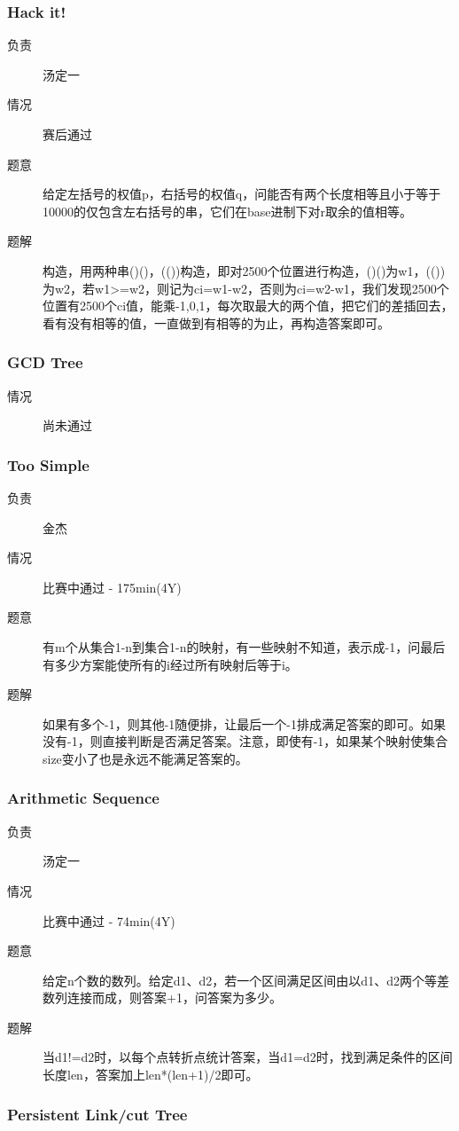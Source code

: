 \documentclass[a4paper, 11pt, nofonts, nocap, fancyhdr]{ctexart}
\newcommand{\problem}[1]{\subsubsection{#1}}
\begin{document}
\problem{Hack it!}

\begin{description}
\item[负责] 汤定一
\item[情况] 赛后通过
\item[题意]
给定左括号的权值p，右括号的权值q，问能否有两个长度相等且小于等于10000的仅包含左右括号的串，它们在base进制下对r取余的值相等。
\item[题解]
构造，用两种串()()，(())构造，即对2500个位置进行构造，()()为w1，(())为w2，若w1>=w2，则记为ci=w1-w2，否则为ci=w2-w1，我们发现2500个位置有2500个ci值，能乘{-1,0,1}，每次取最大的两个值，把它们的差插回去，看有没有相等的值，一直做到有相等的为止，再构造答案即可。
\end{description}

\problem{GCD Tree}

\begin{description}
\item[情况] 尚未通过
\end{description}

\problem{Too Simple}

\begin{description}
\item[负责] 金杰
\item[情况] 比赛中通过 - 175min(4Y)
\item[题意]
有m个从集合1-n到集合1-n的映射，有一些映射不知道，表示成-1，问最后有多少方案能使所有的i经过所有映射后等于i。
\item[题解]
如果有多个-1，则其他-1随便排，让最后一个-1排成满足答案的即可。如果没有-1，则直接判断是否满足答案。注意，即使有-1，如果某个映射使集合size变小了也是永远不能满足答案的。
\end{description}

\problem{Arithmetic Sequence}

\begin{description}
\item[负责] 汤定一
\item[情况] 比赛中通过 - 74min(4Y)
\item[题意]
给定n个数的数列。给定d1、d2，若一个区间满足区间由以d1、d2两个等差数列连接而成，则答案+1，问答案为多少。
\item[题解]
当d1!=d2时，以每个点转折点统计答案，当d1=d2时，找到满足条件的区间长度len，答案加上len*(len+1)/2即可。
\end{description}

\problem{Persistent Link/cut Tree}
\end{document}
